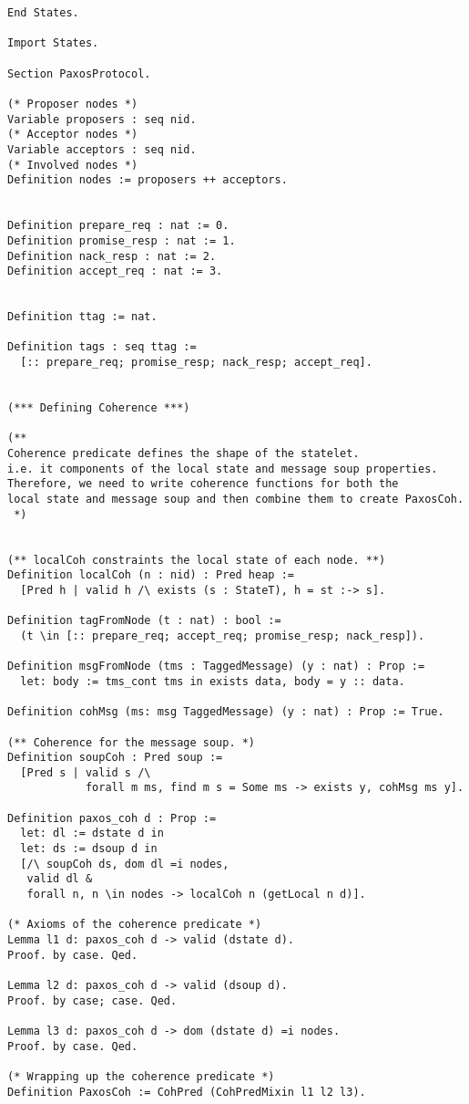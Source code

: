 \begin{landscape}
\begin{multicols*}{2}
\begin{lstlisting}[style=SourceCodeListing]
End States.

Import States.

Section PaxosProtocol.

(* Proposer nodes *)
Variable proposers : seq nid.
(* Acceptor nodes *)
Variable acceptors : seq nid.
(* Involved nodes *)
Definition nodes := proposers ++ acceptors.


Definition prepare_req : nat := 0.
Definition promise_resp : nat := 1.
Definition nack_resp : nat := 2.
Definition accept_req : nat := 3.


Definition ttag := nat.

Definition tags : seq ttag :=
  [:: prepare_req; promise_resp; nack_resp; accept_req].


(*** Defining Coherence ***)

(**
Coherence predicate defines the shape of the statelet.
i.e. it components of the local state and message soup properties.
Therefore, we need to write coherence functions for both the
local state and message soup and then combine them to create PaxosCoh.
 *)


(** localCoh constraints the local state of each node. **)
Definition localCoh (n : nid) : Pred heap :=
  [Pred h | valid h /\ exists (s : StateT), h = st :-> s].

Definition tagFromNode (t : nat) : bool :=
  (t \in [:: prepare_req; accept_req; promise_resp; nack_resp]).

Definition msgFromNode (tms : TaggedMessage) (y : nat) : Prop :=
  let: body := tms_cont tms in exists data, body = y :: data.

Definition cohMsg (ms: msg TaggedMessage) (y : nat) : Prop := True.

(** Coherence for the message soup. *)
Definition soupCoh : Pred soup :=
  [Pred s | valid s /\
            forall m ms, find m s = Some ms -> exists y, cohMsg ms y].

Definition paxos_coh d : Prop :=
  let: dl := dstate d in
  let: ds := dsoup d in
  [/\ soupCoh ds, dom dl =i nodes,
   valid dl &
   forall n, n \in nodes -> localCoh n (getLocal n d)].

(* Axioms of the coherence predicate *)
Lemma l1 d: paxos_coh d -> valid (dstate d).
Proof. by case. Qed.

Lemma l2 d: paxos_coh d -> valid (dsoup d).
Proof. by case; case. Qed.

Lemma l3 d: paxos_coh d -> dom (dstate d) =i nodes.
Proof. by case. Qed.

(* Wrapping up the coherence predicate *)
Definition PaxosCoh := CohPred (CohPredMixin l1 l2 l3).


\end{lstlisting}
\end{multicols*}
\end{landscape}
